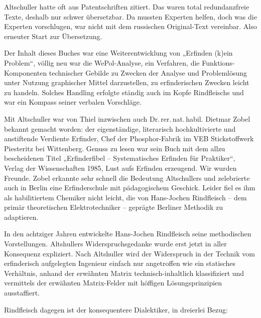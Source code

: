 \documentclass[11pt,a4paper]{article}
\begin{document}
Altschuller hatte oft aus Patentschriften zitiert. Das waren total
redundanzfreie Texte, deshalb nur schwer übersetzbar. Da mussten Experten
helfen, doch was die Experten vorschlugen, war nicht mit dem russischen
Original-Text vereinbar. Also erneuter Start zur Übersetzung.

Der Inhalt dieses Buches war eine Weiterentwicklung von „Erfinden (k)ein
Problem“, völlig neu war die WePol-Analyse, ein Verfahren, die
Funktions-Komponenten technischer Gebilde zu Zwecken der Analyse und
Problemlösung unter Nutzung graphischer Mittel darzustellen, zu erfinderischen
Zwecken leicht zu handeln. Solches Handling erfolgte ständig auch im Kopfe
Rindfleischs und war ein Kompass seiner verbalen Vorschläge.

Mit Altschuller war von Thiel inzwischen auch Dr.\,rer.\,nat.\,habil. Dietmar
Zobel bekannt gemacht worden: der eigenständige, literarisch hochkultivierte
und anstiftende Verdiente Erfinder, Chef der Phosphor-Fabrik im VEB
Stickstoffwerk Piesteritz bei Wittenberg. Genuss zu lesen war sein Buch mit dem
allzu bescheidenen Titel „Erfinderfibel – Systematisches Erfinden für
Praktiker“, Verlag der Wissenschaften 1985, Lust aufs Erfinden erzeugend. Wir
wurden Freunde. Zobel erkannte sehr schnell die Bedeutung Altschullers und
zelebrierte auch in Berlin eine Erfinderschule mit pädagogischem Geschick.
Leider fiel es ihm als habilitiertem Chemiker nicht leicht, die von Hans-Jochen
Rindfleisch – dem primär theoretischen Elektrotechniker -- geprägte Berliner
Methodik zu adaptieren.

In den achtziger Jahren entwickelte Hans-Jochen Rindfleisch seine methodischen
Vorstellungen. Altshullers Widerspruchsgedanke wurde erst jetzt in aller
Konsequenz expliziert. Nach Altshuller wird der Widerspruch in der Technik vom
erfinderisch aufgelegten Ingenieur einfach nur angetroffen wie ein statisches
Verhältnis, anhand der erwähnten Matrix technisch-inhaltlich klassifiziert und
vermittels der erwähnten Matrix-Felder mit höffigen Lösungsprinzipien
ausstaffiert.

Rindfleisch dagegen ist der konsequentere Dialektiker, in dreierlei Bezug:
\end{document}
